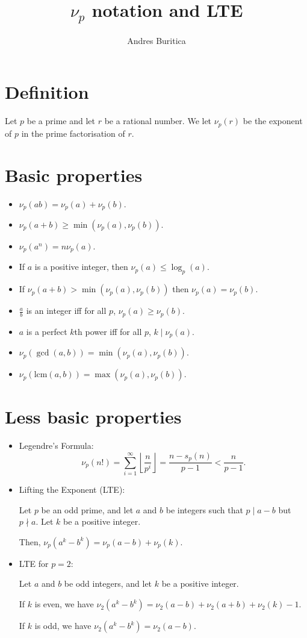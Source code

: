\documentclass{article}
\title{$\nu_p$ notation and LTE}
\author{Andres Buritica}
\date{}
\newcommand\lcm{\mathrm{lcm}}
\begin{document}
\maketitle
\section{Definition}
  Let $p$ be a prime and let $r$ be a rational number. We let $\nu_p(r)$ be the
  exponent of $p$ in the prime factorisation of $r$.
\section{Basic properties}
\begin{itemize}
  \item $\nu_p(ab)=\nu_p(a)+\nu_p(b)$.
  \item $\nu_p(a+b)\ge\min(\nu_p(a),\nu_p(b))$.
  \item $\nu_p(a^n)=n\nu_p(a)$.
  \item If $a$ is a positive integer, then $\nu_p(a)\le\log_p(a)$.
  \item If $\nu_p(a+b)>\min(\nu_p(a),\nu_p(b))$ then $\nu_p(a)=\nu_p(b)$.
  \item $\frac ab$ is an integer iff for all $p$, $\nu_p(a)\ge\nu_p(b)$.
  \item $a$ is a perfect $k$th power iff for all $p$, $k\mid\nu_p(a)$.
  \item $\nu_p(\gcd(a,b))=\min(\nu_p(a),\nu_p(b))$.
  \item $\nu_p(\lcm(a,b))=\max(\nu_p(a),\nu_p(b))$.
\end{itemize}
\section{Less basic properties}
\begin{itemize}
  \item Legendre's Formula:
    \[\nu_p(n!)=\sum_{i=1}^\infty\left\lfloor\frac
      n{p^i}\right\rfloor=\frac{n-s_p(n)}{p-1}<\frac
    n{p-1}.\]
  \item Lifting the Exponent (LTE):

    Let $p$ be an odd prime, and let $a$ and $b$ be integers such that $p\mid
    a-b$ but $p\nmid a$. Let $k$ be a positive integer.

    Then, $\nu_p\left(a^k-b^k\right)=\nu_p(a-b)+\nu_p(k)$.
  \item LTE for $p=2$:

    Let $a$ and $b$ be odd integers, and let $k$ be a positive integer.

    If $k$ is even, we have $\nu_2(a^k-b^k)=\nu_2(a-b)+\nu_2(a+b)+\nu_2(k)-1$.

    If $k$ is odd, we have $\nu_2(a^k-b^k)=\nu_2(a-b)$.
\end{itemize}
\end{document}
